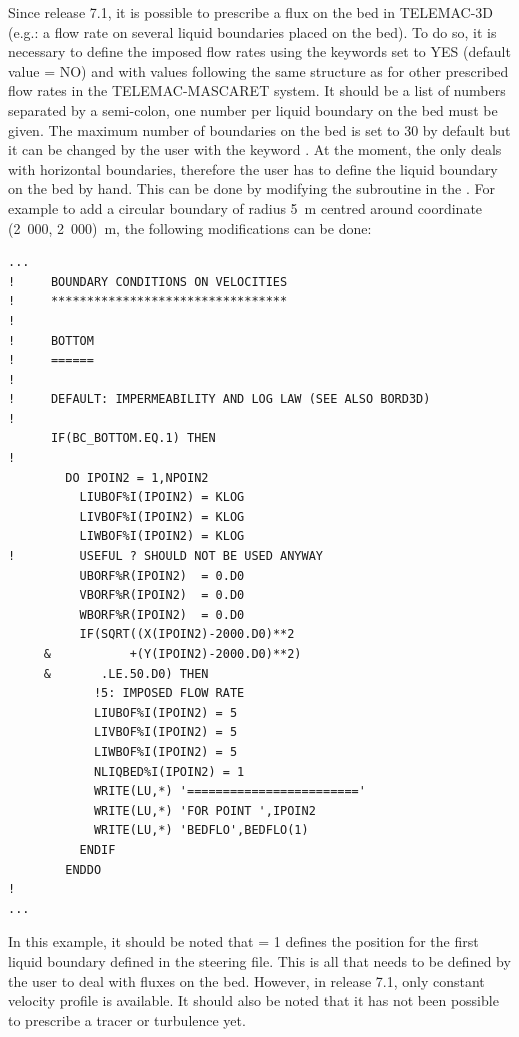Since release 7.1, it is possible to prescribe a flux on the bed in TELEMAC-3D
(e.g.: a flow rate on several liquid boundaries placed on the bed).
To do so, it is necessary to define the imposed flow rates using the keywords
 set to YES (default value = NO)
and  with values following the same
structure as for other prescribed flow rates in the TELEMAC-MASCARET system.
It should be a list of numbers separated by a semi-colon, one number per
liquid boundary on the bed must be given.
The maximum number of boundaries on the bed is set to 30 by default
but it can be changed by the user with the keyword .
At the moment, the  only deals with horizontal
boundaries, therefore the user has to define the liquid boundary on the bed by hand.
This can be done by modifying the subroutine 
in the .
For example to add a circular boundary of radius 5~m centred around coordinate
(2~000, 2~000)~m, the following modifications can be done:
\begin{lstlisting}[language=TelFortran]
...
!     BOUNDARY CONDITIONS ON VELOCITIES
!     *********************************
!
!     BOTTOM
!     ======
!
!     DEFAULT: IMPERMEABILITY AND LOG LAW (SEE ALSO BORD3D)
!
      IF(BC_BOTTOM.EQ.1) THEN
!
        DO IPOIN2 = 1,NPOIN2
          LIUBOF%I(IPOIN2) = KLOG
          LIVBOF%I(IPOIN2) = KLOG
          LIWBOF%I(IPOIN2) = KLOG
!         USEFUL ? SHOULD NOT BE USED ANYWAY
          UBORF%R(IPOIN2)  = 0.D0
          VBORF%R(IPOIN2)  = 0.D0
          WBORF%R(IPOIN2)  = 0.D0
          IF(SQRT((X(IPOIN2)-2000.D0)**2
     &           +(Y(IPOIN2)-2000.D0)**2)
     &       .LE.50.D0) THEN
            !5: IMPOSED FLOW RATE
            LIUBOF%I(IPOIN2) = 5
            LIVBOF%I(IPOIN2) = 5
            LIWBOF%I(IPOIN2) = 5
            NLIQBED%I(IPOIN2) = 1
            WRITE(LU,*) '========================'
            WRITE(LU,*) 'FOR POINT ',IPOIN2
            WRITE(LU,*) 'BEDFLO',BEDFLO(1)
          ENDIF
        ENDDO
!
...
\end{lstlisting}

In this example, it should be noted that  = 1
defines the position for the first liquid boundary defined in the steering file.
This is all that needs to be defined by the user to deal with fluxes on the bed.
However, in release 7.1, only constant velocity profile is available.
It should also be noted that it has not been possible to prescribe a tracer
or turbulence yet.

